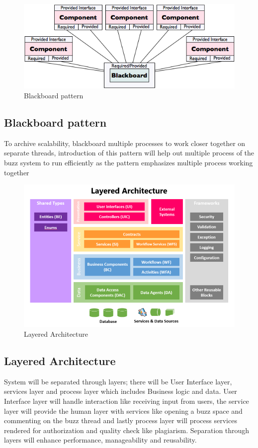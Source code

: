
\begin{figure}[H]	
\graphicspath{ {images/} }
    	\includegraphics[scale=0.5]{bbp.png}
    	\caption{Blackboard pattern }
	\end{figure}
\subsection*{Blackboard pattern} 
To archive scalability, blackboard multiple processes to work closer together on separate threads, introduction of this pattern will help out multiple process of the buzz system to run efficiently as the pattern emphasizes multiple process working together


\begin{figure}[H]	
\graphicspath{ {images/} }
    	\includegraphics[scale=0.5]{layered.png}
    	\caption{Layered Architecture }
	\end{figure}
\subsection*{Layered Architecture}

System will be separated through layers; there will be User Interface  layer, services layer and process layer which includes Business logic and data. User Interface layer will handle interaction like receiving input from users, the service layer will provide the human layer with services like opening a buzz space and commenting on the buzz thread and lastly process layer will process services rendered for authorization and quality check like plagiarism. Separation through layers will enhance performance, manageability and reusability.

